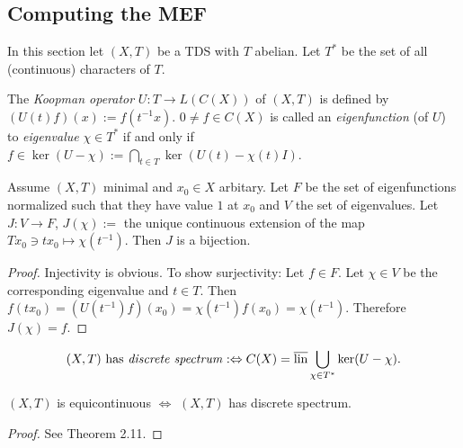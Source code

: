 \subsection{Computing the MEF}
In this section let $(X,T)$ be a TDS with $T$ abelian.
Let $T^*$ be the set of all (continuous) characters of $T$.
\begin{definition}
  The \emph{Koopman operator} $U : T \to L(C(X))$ of $(X,T)$ is defined by $(U(t) f)(x) := f(t^{-1}x)$.
  $0 \neq f \in C(X)$ is called an \emph{eigenfunction} (of $U$) to \emph{eigenvalue} $\chi \in T^*$ if and only if $f \in \ker (U-\chi):= \bigcap_{t \in T} \ker (U(t)- \chi (t)I)$.
\end{definition}
\begin{proposition}
  Assume $(X,T)$ minimal and $x_0 \in X$ arbitary. Let $F$ be the set of eigenfunctions normalized such that they have value $1$ at $x_0$ and $V$ the set of eigenvalues. Let $J: V \to F$, $J(\chi):=$ the unique continuous extension of the map $T x_0 \ni t x_0 \mapsto \chi(t^{-1})$. Then $J$ is a bijection.
\end{proposition}
\begin{proof}
  Injectivity is obvious.
  To show surjectivity:
  Let $f \in F$. Let $\chi \in V$ be the corresponding eigenvalue and $t \in T$. Then $ f(t x_0) = (U(t^{-1}) f)(x_0) = \chi(t^{-1}) f(x_0) = \chi (t^{-1})$. Therefore $J(\chi ) = f$.
\end{proof}
\begin{definition}
  \begin{equation*}
    (X,T) \ \text{has \emph{discrete spectrum}}:\Leftrightarrow C(X) = \overline{\operatorname{lin}} \bigcup_{\chi \in T^*} \ker (U- \chi).
  \end{equation*}
\end{definition}
\begin{theorem}
  \label{mef:thm:equiEQdiscrete}
  $(X,T)$ is equicontinuous $\Leftrightarrow$ $(X,T)$ has discrete spectrum.
\end{theorem}
\begin{proof}
  See \cite{HK2023} Theorem 2.11.
\end{proof}


